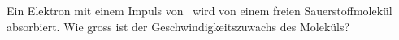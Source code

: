 Ein Elektron mit einem Impuls von \pElO\ wird von einem freien Sauerstoffmolekül absorbiert. Wie gross ist der Geschwindigkeitszuwachs des Moleküls?
